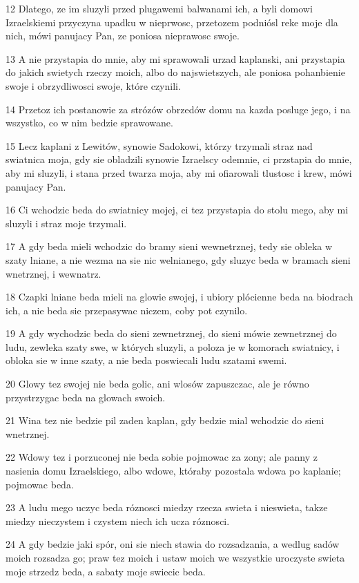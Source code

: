 \par 12 Dlatego, ze im sluzyli przed plugawemi balwanami ich, a byli domowi Izraelskiemi przyczyna upadku w nieprwosc, przetozem podniósl reke moje dla nich, mówi panujacy Pan, ze poniosa nieprawosc swoje.
\par 13 A nie przystapia do mnie, aby mi sprawowali urzad kaplanski, ani przystapia do jakich swietych rzeczy moich, albo do najswietszych, ale poniosa pohanbienie swoje i obrzydliwosci swoje, które czynili.
\par 14 Przetoz ich postanowie za strózów obrzedów domu na kazda posluge jego, i na wszystko, co w nim bedzie sprawowane.
\par 15 Lecz kaplani z Lewitów, synowie Sadokowi, którzy trzymali straz nad swiatnica moja, gdy sie obladzili synowie Izraelscy odemnie, ci przstapia do mnie, aby mi sluzyli, i stana przed twarza moja, aby mi ofiarowali tlustosc i krew, mówi panujacy Pan.
\par 16 Ci wchodzic beda do swiatnicy mojej, ci tez przystapia do stolu mego, aby mi sluzyli i straz moje trzymali.
\par 17 A gdy beda mieli wchodzic do bramy sieni wewnetrznej, tedy sie obleka w szaty lniane, a nie wezma na sie nic welnianego, gdy sluzyc beda w bramach sieni wnetrznej, i wewnatrz.
\par 18 Czapki lniane beda mieli na glowie swojej, i ubiory plócienne beda na biodrach ich, a nie beda sie przepasywac niczem, coby pot czynilo.
\par 19 A gdy wychodzic beda do sieni zewnetrznej, do sieni mówie zewnetrznej do ludu, zewleka szaty swe, w których sluzyli, a poloza je w komorach swiatnicy, i obloka sie w inne szaty, a nie beda poswiecali ludu szatami swemi.
\par 20 Glowy tez swojej nie beda golic, ani wlosów zapuszczac, ale je równo przystrzygac beda na glowach swoich.
\par 21 Wina tez nie bedzie pil zaden kaplan, gdy bedzie mial wchodzic do sieni wnetrznej.
\par 22 Wdowy tez i porzuconej nie beda sobie pojmowac za zony; ale panny z nasienia domu Izraelskiego, albo wdowe, któraby pozostala wdowa po kaplanie; pojmowac beda.
\par 23 A ludu mego uczyc beda róznosci miedzy rzecza swieta i nieswieta, takze miedzy nieczystem i czystem niech ich ucza róznosci.
\par 24 A gdy bedzie jaki spór, oni sie niech stawia do rozsadzania, a wedlug sadów moich rozsadza go; praw tez moich i ustaw moich we wszystkie uroczyste swieta moje strzedz beda, a sabaty moje swiecic beda.

